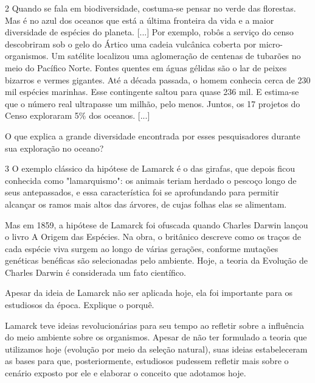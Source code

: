 {\num{2} Quando se fala em biodiversidade, costuma-se pensar no verde das florestas. Mas é no azul dos oceanos que está a última fronteira da vida e a maior diversidade de espécies do planeta. [...] Por exemplo, robôs a serviço do censo descobriram sob o gelo do Ártico uma cadeia vulcânica coberta por micro-organismos. Um satélite localizou uma aglomeração de centenas de tubarões no meio do Pacífico Norte. Fontes quentes em águas gélidas são o lar de peixes bizarros e vermes gigantes. Até a década passada, o homem conhecia cerca de 230 mil espécies marinhas. Esse contingente saltou para quase 236 mil. E estima-se que o número real ultrapasse um milhão, pelo menos. Juntos, os 17 projetos do Censo exploraram 5\% dos oceanos. [...]


O que explica a grande diversidade encontrada por esses pesquisadores
durante sua exploração no oceano?



\num{3}  O exemplo clássico da hipótese de Lamarck é o das girafas, que depois ficou conhecida como "lamarquismo": os animais teriam herdado o pescoço longo de seus antepassados, e essa característica foi se aprofundando para permitir alcançar os ramos mais altos das árvores, de cujas folhas elas se alimentam.

Mas em 1859, a hipótese de Lamarck foi ofuscada quando Charles Darwin
lançou o livro A Origem das Espécies. Na obra, o britânico descreve como
os traços de cada espécie viva surgem ao longo de várias gerações,
conforme mutações genéticas benéficas são selecionadas pelo ambiente.
Hoje, a teoria da Evolução de Charles Darwin é considerada um fato
científico.


Apesar da ideia de Lamarck não ser aplicada hoje, ela foi importante
para os estudiosos da época. Explique o porquê.


Lamarck teve ideias revolucionárias para seu tempo ao refletir sobre a
influência do meio ambiente sobre os organismos. Apesar de não ter
formulado a teoria que utilizamos hoje (evolução por meio da seleção
natural), suas ideias estabeleceram as bases para que, posteriormente,
estudiosos pudessem refletir mais sobre o cenário exposto por ele e
elaborar o conceito que adotamos hoje.}

